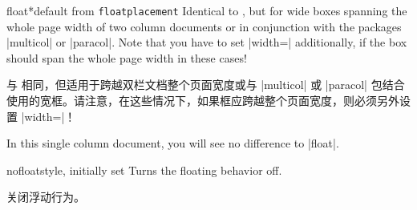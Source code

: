 \begin{docTcbKey}{float*}{}{default from \texttt{floatplacement}}
Identical to , but for wide boxes spanning the whole page
width of two column documents or in conjunction with the packages
|multicol| or |paracol|. Note that you have to set |width=\textwidth|
additionally, if the box should span the whole page width in these cases!

与  相同，但适用于跨越双栏文档整个页面宽度或与 |multicol| 或 |paracol| 包结合使用的宽框。请注意，在这些情况下，如果框应跨越整个页面宽度，则必须另外设置 |width=\textwidth|！

\begin{dispListing}
\begin{tcolorbox}[float*=b, title=Floating box from |float*|,width=\textwidth,
enhanced,watermark text={I'm also floating}]
In this single column document, you will see no difference to |float|.
\end{tcolorbox}
\end{dispListing}
\end{docTcbKey}
{\tcbusetemp}




\begin{docTcbKey}{nofloat}{}{style, initially set}
Turns the floating behavior off.

关闭浮动行为。
\end{docTcbKey}


